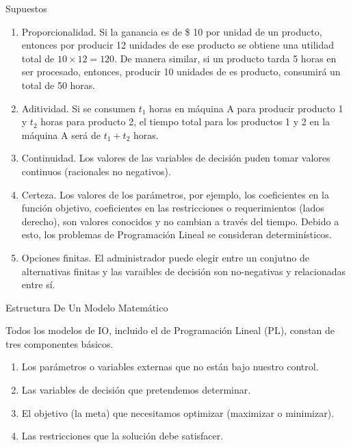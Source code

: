 \begin{frame}{Supuestos}
  \begin{enumerate} \parskip3mm \justifying
  \item<only@1> Proporcionalidad. Si la ganancia es de \$ 10 por unidad de un producto, entonces por producir 12 unidades de ese producto se obtiene una utilidad total de $10 \times 12 = 120.$ De manera similar, si un producto tarda 5 horas en ser procesado, entonces, producir 10 unidades de es producto, consumirá un total de 50 horas. 
  \item<only@1> Aditividad. Si se consumen $t_1$ horas en máquina A para producir producto 1 y $t_2$ horas para producto 2, el tiempo total para los productos 1 y 2 en la máquina A será de $t_1 + t_2$ horas.
  \item<only@1> Continuidad. Los valores de las variables de decisión puden tomar valores continuos (racionales no negativos).
  \item<only@2> Certeza. Los valores de los parámetros, por ejemplo, los coeficientes en la función objetivo, coeficientes en las restricciones o requerimientos (lados derecho), son valores conocidos y no cambian a través del tiempo. Debido a esto, los problemas de Programación Lineal se consideran determinísticos.
  \item<only@2> Opciones finitas. El administrador puede elegir entre un conjutno de alternativas finitas y las varaibles de decisión son no-negativas y relacionadas entre sí.
  \end{enumerate}
\end{frame}



\begin{frame}{Estructura De Un Modelo Matemático}

Todos los modelos de IO, incluido el de Programación Lineal (PL), constan de tres componentes básicos.

  \begin{enumerate} \justifying 
  \item Los \alert{parámetros} o variables externas que no están bajo nuestro control.
  \item Las \alert{variables de decisión} que pretendemos determinar.
  \item El \alert{objetivo} (la meta) que necesitamos optimizar (maximizar o minimizar).
  \item Las \alert{restricciones} que la solución debe satisfacer.
  \end{enumerate}
   
\end{frame}


